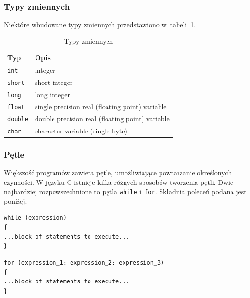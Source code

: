 \subsubsection{Typy zmiennych}

Niektóre wbudowane typy zmiennych przedstawiono w~tabeli~\ref{tab:typyzmiennych}.

\begin{table}[h!]
\centering
\caption{Typy zmiennych}
\setlength{\arrayrulewidth}{1pt}
\setlength{\tabcolsep}{6pt}
\renewcommand{\arraystretch}{1.2}
\begin{tabular}{ |p{}|p{}|}
\hline \rowcolor{gray}
\textbf{Typ} & \textbf{Opis} \\ \hline
\mbox{\lstinline[style=MyBashStyle]{int}} & integer \\ \hline
\mbox{\lstinline[style=MyBashStyle]{short}} & short integer \\ \hline
\mbox{\lstinline[style=MyBashStyle]{long}} & long integer \\ \hline
\mbox{\lstinline[style=MyBashStyle]{float}} & single precision real (floating point) variable \\ \hline
\mbox{\lstinline[style=MyBashStyle]{double}} & double precision real (floating point) variable \\ \hline
\mbox{\lstinline[style=MyBashStyle]{char}} & character variable (single byte) \\ \hline
\end{tabular}
\label{tab:typyzmiennych}
\end{table}

\subsubsection{Pętle}

Większość programów zawiera pętle, umożliwiające powtarzanie określonych czynności. W języku C istnieje kilka różnych sposobów tworzenia pętli. Dwie najbardziej rozpowszechnione to pętla \lstinline[style=MyCStyle]{while} i~\lstinline[style=MyCStyle]{for}. Składnia poleceń podana jest poniżej.


\begin{lstlisting}[style=MyCStyle]
while (expression)
{
...block of statements to execute...
}
\end{lstlisting}

\begin{lstlisting}[style=MyCStyle]
for (expression_1; expression_2; expression_3)
{
...block of statements to execute...
}
\end{lstlisting}

